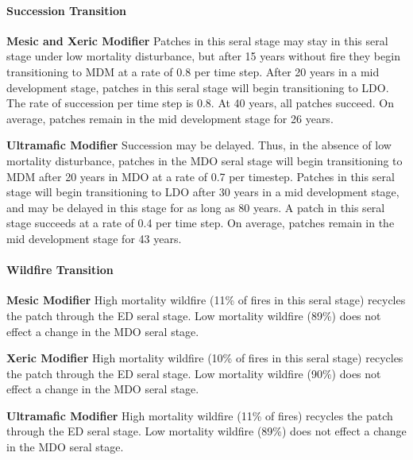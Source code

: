 \paragraph{Succession Transition}
\begin{adjustwidth}{2cm}{}
\textbf{Mesic and Xeric Modifier } Patches in this seral stage may stay in this seral stage under low mortality disturbance, but after 15 years without fire they begin transitioning to MDM at a rate of 0.8 per time step. After 20 years in a mid development stage, patches in this seral stage will begin transitioning to LDO. The rate of succession per time step is 0.8. At 40 years, all patches succeed. On average, patches remain in the mid development stage for 26 years.


\medskip
\noindent \textbf{Ultramafic Modifier}  Succession may be delayed. Thus, in the absence of low mortality disturbance, patches in the MDO seral stage will begin transitioning to MDM after 20 years in MDO at a rate of 0.7 per timestep. Patches in this seral stage will begin transitioning to LDO after 30 years in a mid development stage, and may be delayed in this stage for as long as 80 years. A patch in this seral stage succeeds at a rate of 0.4 per time step. On average, patches remain in the mid development stage for 43 years.

\end{adjustwidth}
\paragraph{Wildfire Transition}
\begin{adjustwidth}{2cm}{}
\textbf{Mesic Modifier } High mortality wildfire (11\% of fires in this seral stage) recycles the patch through the ED seral stage. Low mortality wildfire (89\%) does not effect a change in the MDO seral stage.


\medskip
\noindent \textbf{Xeric Modifier}  High mortality wildfire (10\% of fires in this seral stage) recycles the patch through the ED seral stage. Low mortality wildfire (90\%) does not effect a change in the MDO seral stage.


\medskip
\noindent \textbf{Ultramafic Modifier} High mortality wildfire (11\% of fires) recycles the patch through the ED seral stage. Low mortality wildfire (89\%) does not effect a change in the MDO seral stage.

\end{adjustwidth}

\noindent\hrulefill


